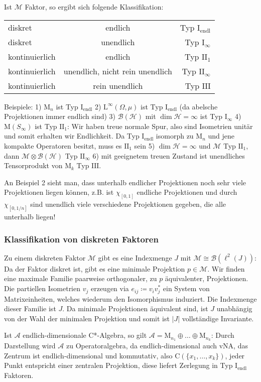 \documentclass[11pt,a4paper]{scrartcl}
\newcommand{\Hc}{\mathcal{H}}
\newcommand{\A}{\mathcal{A}}
\newcommand{\B}{\mathcal{B}}
\newcommand{\M}{\mathcal{M}}
\newcommand{\Ifin}{\mathrm{I}_\mathrm{endl}}
\newcommand{\Iinf}{\mathrm{I}_\infty}
\newcommand{\IIfin}{\mathrm{II}_1}
\newcommand{\IIinf}{\mathrm{II}_\infty}
\newcommand{\III}{\mathrm{III}}
\theoremstyle{plain}
\theoremstyle{definition}
\theoremstyle{remark}
\begin{document}
Ist $\M$ Faktor, so ergibt sich folgende Klassifikation:

\begin{table}[h]
    \centering
    \begin{tabular}{l|c||r}
        diskret & endlich & Typ $\Ifin$ \\
        diskret & unendlich & Typ $\Iinf$ \\
        \hline
        kontinuierlich & endlich & Typ $\IIfin$ \\
        kontinuierlich & unendlich, nicht rein unendlich & Typ $\IIinf$ \\
        \hline
        kontinuierlich & rein unendlich & Typ $\III$
    \end{tabular}
\end{table}

Beispiele: 1) $\mathrm{M}_n$ ist Typ $\Ifin$ 2) $\mathrm{L}^\infty(\Omega, \mu)$ ist Typ $\Ifin$ (da abelsche Projektionen immer endlich sind) 3) $\B(\Hc)$ mit $\dim \Hc = \infty$ ist Typ $\Iinf$ 4) $\mathrm{M}(S_\infty)$ ist Typ $\IIfin$: Wir haben treue normale Spur, also sind Isometrien unitär und somit erhalten wir Endlichkeit. Da Typ $\Ifin$ isomorph zu $\mathrm{M}_n$ und jene kompakte Operatoren besitzt, muss es $\IIfin$ sein 5) $\dim \Hc = \infty$ und $\M$ Typ $\IIfin$, dann $\M \otimes \B(\Hc)$ Typ $\IIinf$ 6) mit geeignetem treuen Zustand ist unendliches Tensorprodukt von $\mathrm{M}_k$ Typ $\III$.

An Beispiel 2 sieht man, dass unterhalb endlicher Projektionen noch sehr viele Projektionen liegen können, z.B. ist $\chi_{[0,1]}$ endliche Projektionen und durch $\chi_{[0,1/n]}$ sind unendlich viele verschiedene Projektionen gegeben, die alle unterhalb liegen!

\subsubsection{Klassifikation von diskreten Faktoren}

Zu einem diskreten Faktor $\M$ gibt es eine Indexmenge $J$ mit $\M\cong \B(\ell^2(J))$: Da der Faktor diskret ist, gibt es eine minimale Projektion $p\in \M$. Wir finden eine maximale Familie paarweise orthogonaler, zu $p$ äquivalenter, Projektionen. Die partiellen Isometrien $v_j$ erzeugen via $e_{ij}\coloneqq v_iv^*_j$ ein System von Matrixeinheiten, welches wiederum den Isomorphismus induziert. Die Indexmenge dieser Familie ist $J$. Da minimale Projektionen äquivalent sind, ist $J$ unabhängig von der Wahl der minimalen Projektion und somit ist $|J|$ vollständige Invariante. 

Ist $\A$ endlich-dimensionale C*-Algebra, so gilt $\A=\mathrm{M}_{n_1}\oplus \dots\oplus \mathrm{M}_{n_k}$: Durch Darstellung wird $\A$ zu Operatoralgebra, da endlich-dimensional auch vNA, das Zentrum ist endlich-dimensional und kommutativ, also $\mathrm{C}(\{x_1,\dots,x_k\})$, jeder Punkt entspricht einer zentralen Projektion, diese liefert Zerlegung in Typ $\Ifin$ Faktoren.
\end{document}
